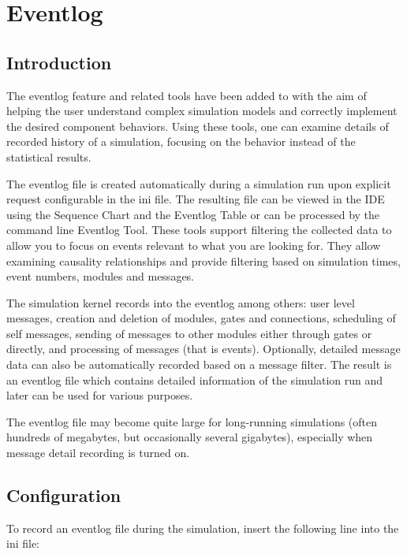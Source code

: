 \chapter{Eventlog}
\label{cha:eventlog}

\section{Introduction}
\label{sec:eventlog:introduction}

The eventlog feature and related tools have been added to {\opp} with the aim of
helping the user understand complex simulation models and correctly implement the
desired component behaviors. Using these tools, one can examine details of recorded
history of a simulation, focusing on the behavior instead of the statistical results.

The eventlog file is created automatically during a simulation run upon explicit request
configurable in the ini file. The resulting file can be viewed in the {\opp} IDE using
the Sequence Chart and the Eventlog Table or can be processed by the command line Eventlog
Tool. These tools support filtering the collected data to allow you to focus on events
relevant to what you are looking for. They allow examining causality relationships and
provide filtering based on simulation times, event numbers, modules and messages.

The simulation kernel records into the eventlog among others: user level messages,
creation and deletion of modules, gates and connections, scheduling of self messages,
sending of messages to other modules either through gates or directly, and processing of
messages (that is events). Optionally, detailed message data can also be automatically
recorded based on a message filter. The result is an eventlog file which contains detailed
information of the simulation run and later can be used for various purposes.

\begin{note}
    The eventlog file may become quite large for long-running simulations
    (often hundreds of megabytes, but occasionally several gigabytes), especially
    when message detail recording is turned on.
\end{note}

\section{Configuration}

To record an eventlog file during the simulation, insert the following line into
the ini file:

